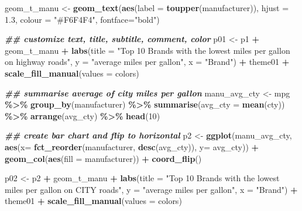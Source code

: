 \documentclass[
]{article}
\newenvironment{Shaded}{\begin{snugshade}}{\end{snugshade}}
\newcommand{\AttributeTok}[1]{\textcolor[rgb]{0.13,0.29,0.53}{#1}}
\newcommand{\DecValTok}[1]{\textcolor[rgb]{0.00,0.00,0.81}{#1}}
\newcommand{\DocumentationTok}[1]{\textcolor[rgb]{0.56,0.35,0.01}{\textbf{\textit{#1}}}}
\newcommand{\FloatTok}[1]{\textcolor[rgb]{0.00,0.00,0.81}{#1}}
\newcommand{\FunctionTok}[1]{\textcolor[rgb]{0.13,0.29,0.53}{\textbf{#1}}}
\newcommand{\NormalTok}[1]{#1}
\newcommand{\OtherTok}[1]{\textcolor[rgb]{0.56,0.35,0.01}{#1}}
\newcommand{\SpecialCharTok}[1]{\textcolor[rgb]{0.81,0.36,0.00}{\textbf{#1}}}
\newcommand{\StringTok}[1]{\textcolor[rgb]{0.31,0.60,0.02}{#1}}
\begin{document}
\begin{Shaded}
\begin{Highlighting}[]
\NormalTok{geom\_t\_manu }\OtherTok{\textless{}{-}} \FunctionTok{geom\_text}\NormalTok{(}\FunctionTok{aes}\NormalTok{(}\AttributeTok{label =} \FunctionTok{toupper}\NormalTok{(manufacturer)),}
                         \AttributeTok{hjust =} \FloatTok{1.3}\NormalTok{,}
                         \AttributeTok{colour =} \StringTok{"\#F6F4F4"}\NormalTok{,}
                         \AttributeTok{fontface=}\StringTok{"bold"}\NormalTok{)}

\DocumentationTok{\#\# customize text, title, subtitle, comment, color}
\NormalTok{p01 }\OtherTok{\textless{}{-}}
\NormalTok{p1 }\SpecialCharTok{+}\NormalTok{ geom\_t\_manu }\SpecialCharTok{+} 
  \FunctionTok{labs}\NormalTok{(}\AttributeTok{title =} \StringTok{"Top 10 Brands with the lowest miles per gallon on highway roads"}\NormalTok{,}
       \AttributeTok{y =} \StringTok{"average miles per gallon"}\NormalTok{,}
       \AttributeTok{x =} \StringTok{"Brand"}\NormalTok{) }\SpecialCharTok{+}
\NormalTok{  theme01 }\SpecialCharTok{+}
  \FunctionTok{scale\_fill\_manual}\NormalTok{(}\AttributeTok{values =}\NormalTok{ colors)}

\DocumentationTok{\#\# summarise average of city miles per gallon}
\NormalTok{manu\_avg\_cty }\OtherTok{\textless{}{-}}\NormalTok{ mpg }\SpecialCharTok{\%\textgreater{}\%}
  \FunctionTok{group\_by}\NormalTok{(manufacturer) }\SpecialCharTok{\%\textgreater{}\%}
  \FunctionTok{summarise}\NormalTok{(}\AttributeTok{avg\_cty =} \FunctionTok{mean}\NormalTok{(cty)) }\SpecialCharTok{\%\textgreater{}\%}
  \FunctionTok{arrange}\NormalTok{(avg\_cty) }\SpecialCharTok{\%\textgreater{}\%}
  \FunctionTok{head}\NormalTok{(}\DecValTok{10}\NormalTok{)}

\DocumentationTok{\#\# create bar chart and flip to horizontal}
\NormalTok{p2 }\OtherTok{\textless{}{-}} \FunctionTok{ggplot}\NormalTok{(manu\_avg\_cty, }\FunctionTok{aes}\NormalTok{(}\AttributeTok{x=} \FunctionTok{fct\_reorder}\NormalTok{(manufacturer, }\FunctionTok{desc}\NormalTok{(avg\_cty)), }\AttributeTok{y=}\NormalTok{ avg\_cty)) }\SpecialCharTok{+}
  \FunctionTok{geom\_col}\NormalTok{(}\FunctionTok{aes}\NormalTok{(}\AttributeTok{fill =}\NormalTok{ manufacturer)) }\SpecialCharTok{+} \FunctionTok{coord\_flip}\NormalTok{()}

\NormalTok{p02 }\OtherTok{\textless{}{-}}
\NormalTok{p2 }\SpecialCharTok{+}\NormalTok{ geom\_t\_manu }\SpecialCharTok{+} 
  \FunctionTok{labs}\NormalTok{(}\AttributeTok{title =} \StringTok{"Top 10 Brands with the lowest miles per gallon on CITY roads"}\NormalTok{,}
       \AttributeTok{y =} \StringTok{"average miles per gallon"}\NormalTok{,}
       \AttributeTok{x =} \StringTok{"Brand"}\NormalTok{) }\SpecialCharTok{+}
\NormalTok{  theme01 }\SpecialCharTok{+}
  \FunctionTok{scale\_fill\_manual}\NormalTok{(}\AttributeTok{values =}\NormalTok{ colors)}
\end{Highlighting}
\end{Shaded}
\end{document}
